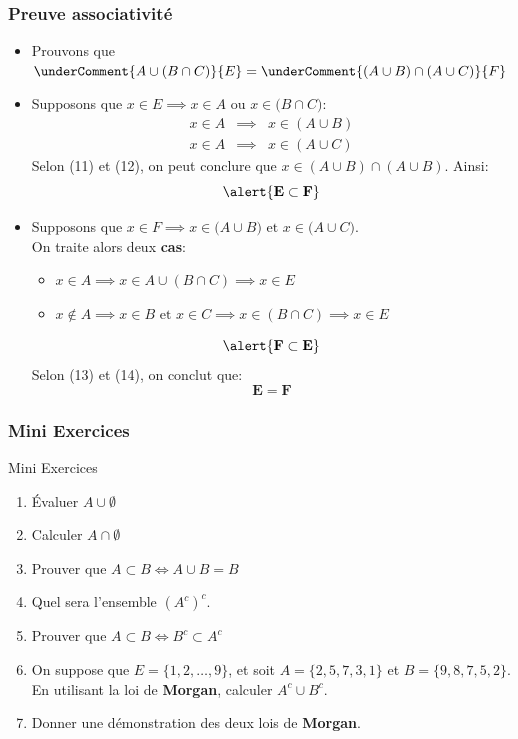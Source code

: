 \documentclass{beamer}
\begin{document}
\begin{frame}[t]
  \frametitle{Preuve associativité}
  \scriptsize
  \begin{itemize}
    \item Prouvons que $\underComment{A \cup ( B \cap C)}{E} = \underComment{(A
      \cup B) \cap (A\cup C)}{F}$
      \pause
    \item Supposons que $x\in E\implies x \in A \text{ ou } x\in\big( B \cap C\big)$:
      \begin{eqnarray}
        x\in A &\implies  &  x\in (A \cup B)\\
        x\in A &\implies  &  x\in (A \cup C)
      \end{eqnarray}
      Selon (11) et (12), on peut conclure que $x\in (A\cup B) \cap (A \cup B)$.
      Ainsi:
      \begin{equation}
        \alert{\mathbf{E \subset F}}
      \end{equation}
      \pause
    \item Supposons que $x\in F \implies x\in \big(A\cup B\big) \text{ et } x\in
      \big(A\cup C\big)$.\\
      On traite alors deux \textbf{cas}:
      \begin{itemize}
        \item $x\in A \implies x\in A \cup( B \cap C) 
          \implies x\in E$
        \item $x\not\in A\implies x\in B \text{ et } x\in C \implies x\in (B\cap
          C)\implies x\in E$
      \end{itemize}
      \begin{equation}
        \mathbf{\alert{F \subset E}}
      \end{equation}
      \pause
      Selon (13)  et (14), on conclut que:
      \begin{equation}
        \mathbf{E = F}
      \end{equation}
  \end{itemize} 
\end{frame}
\begin{frame}[<+->]
  \frametitle{Mini Exercices}
 \begin{block}{Mini Exercices}
   
   \begin{enumerate}
     \small
     \item Évaluer  $ A \cup \emptyset$
     \item Calculer  $ A \cap \emptyset$
     \item Prouver que $ A \subset B \iff A \cup B = B$
     \item Quel sera l'ensemble $(A^c)^c$.
     \item Prouver que $A\subset B \iff B^c \subset A^c$
     \item On suppose que $E = \{1,2,\ldots, 9\}$, et soit $A=\{2,5,7,3,1\}$ et
       $B = \{9,8,7,5,2\}$. En utilisant la loi de \textbf{Morgan}, calculer
       $A^c \cup  B^c$.
     \item Donner une démonstration des deux lois de \textbf{\alert{Morgan}}.
   \end{enumerate}
 \end{block} 
\end{frame}
\end{document}
